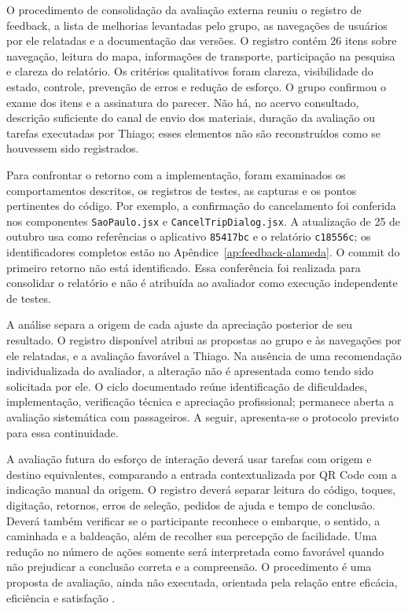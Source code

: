 \documentclass[12pt,oneside,a4paper,brazil,chapter=TITLE]{abntex2}
\begin{document}
O procedimento de consolidação da avaliação externa reuniu o registro de feedback, a lista de melhorias levantadas pelo grupo, as navegações de usuários por ele relatadas e a documentação das versões. O registro contém 26 itens sobre navegação, leitura do mapa, informações de transporte, participação na pesquisa e clareza do relatório. Os critérios qualitativos foram clareza, visibilidade do estado, controle, prevenção de erros e redução de esforço. O grupo confirmou o exame dos itens e a assinatura do parecer. Não há, no acervo consultado, descrição suficiente do canal de envio dos materiais, duração da avaliação ou tarefas executadas por Thiago; esses elementos não são reconstruídos como se houvessem sido registrados.

Para confrontar o retorno com a implementação, foram examinados os comportamentos descritos, os registros de testes, as capturas e os pontos pertinentes do código. Por exemplo, a confirmação do cancelamento foi conferida nos componentes \texttt{SaoPaulo.jsx} e \texttt{CancelTripDialog.jsx}. A atualização de 25 de outubro usa como referências o aplicativo \texttt{85417bc} e o relatório \texttt{c18556c}; os identificadores completos estão no Apêndice~\ref{ap:feedback-alameda}. O commit do primeiro retorno não está identificado. Essa conferência foi realizada para consolidar o relatório e não é atribuída ao avaliador como execução independente de testes.

A análise separa a origem de cada ajuste da apreciação posterior de seu resultado. O registro disponível atribui as propostas ao grupo e às navegações por ele relatadas, e a avaliação favorável a Thiago. Na ausência de uma recomendação individualizada do avaliador, a alteração não é apresentada como tendo sido solicitada por ele. O ciclo documentado reúne identificação de dificuldades, implementação, verificação técnica e apreciação profissional; permanece aberta a avaliação sistemática com passageiros. A seguir, apresenta-se o protocolo previsto para essa continuidade.

A avaliação futura do esforço de interação deverá usar tarefas com origem e destino equivalentes, comparando a entrada contextualizada por QR Code com a indicação manual da origem. O registro deverá separar leitura do código, toques, digitação, retornos, erros de seleção, pedidos de ajuda e tempo de conclusão. Deverá também verificar se o participante reconhece o embarque, o sentido, a caminhada e a baldeação, além de recolher sua percepção de facilidade. Uma redução no número de ações somente será interpretada como favorável quando não prejudicar a conclusão correta e a compreensão. O procedimento é uma proposta de avaliação, ainda não executada, orientada pela relação entre eficácia, eficiência e satisfação \citep{iso924111}.
\end{document}

